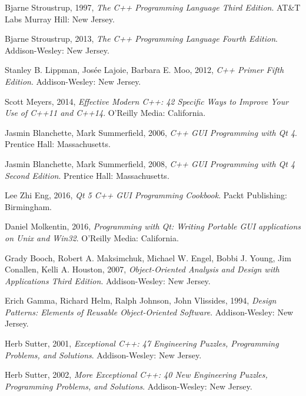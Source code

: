 
\begin{thebibliography}{99}

Bjarne Stroustrup, 1997,
\emph{The C++ Programming Language Third Edition}.
AT\&T Labs Murray Hill: New Jersey.

Bjarne Stroustrup, 2013,
\emph{The C++ Programming Language Fourth Edition}.
Addison-Wesley: New Jersey.

Stanley B. Lippman, Josée Lajoie, Barbara E. Moo, 2012,
\emph{C++ Primer Fifth Edition}.
Addison-Wesley: New Jersey.

Scott Meyers, 2014,
\emph{Effective Modern C++: 42 Specific Ways to Improve Your Use of C++11 and C++14}.
O'Reilly Media: California.

Jasmin Blanchette, Mark Summerfield, 2006,
\emph{C++ GUI Programming with Qt 4}.
Prentice Hall: Massachusetts.

Jasmin Blanchette, Mark Summerfield, 2008,
\emph{C++ GUI Programming with Qt 4 Second Edition}.
Prentice Hall: Massachusetts.

Lee Zhi Eng, 2016,
\emph{Qt 5 C++ GUI Programming Cookbook}.
Packt Publishing: Birmingham.

Daniel Molkentin, 2016,
\emph{Programming with Qt: Writing Portable GUI applications on Unix and Win32}.
O'Reilly Media: California.

Grady Booch, Robert A. Maksimchuk, Michael W. Engel, Bobbi J. Young, Jim Conallen, Kelli A. Houston, 2007,
\emph{Object-Oriented Analysis and Design with Applications Third Edition}.
Addison-Wesley: New Jersey.

Erich Gamma, Richard Helm, Ralph Johnson, John Vlissides, 1994,
\emph{Design Patterns: Elements of Reusable Object-Oriented Software}.
Addison-Wesley: New Jersey.

Herb Sutter, 2001,
\emph{Exceptional C++: 47 Engineering Puzzles, Programming Problems, and Solutions}.
Addison-Wesley: New Jersey.

Herb Sutter, 2002,
\emph{More Exceptional C++: 40 New Engineering Puzzles, Programming Problems, and Solutions}.
Addison-Wesley: New Jersey.


\end{thebibliography}
